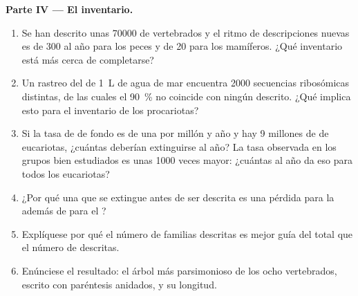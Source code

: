 \begin{problem}
\medskip
\noindent\textbf{Parte IV --- El inventario.}
\begin{enumerate}[resume]
  \item Se han descrito unas \num{70000}  de vertebrados y el ritmo
        de descripciones nuevas es de \num{300} al año para los peces y de
        \num{20} para los mamíferos. ¿Qué inventario está más cerca de
        completarse?
  \item Un rastreo del  de \qty{1}{L} de agua de mar encuentra
        \num{2000} secuencias ribosómicas distintas, de las cuales el
        \qty{90}{\%} no coincide con ningún  descrito. ¿Qué implica
        esto para el inventario de los procariotas?
  \item Si la tasa de  de fondo es de una  por millón y año
        y hay \num{9} millones de  de eucariotas, ¿cuántas deberían
        extinguirse al año? La tasa observada en los grupos bien estudiados
        es unas \num{1000} veces mayor: ¿cuántas al año da eso para todos
        los eucariotas?
  \item ¿Por qué una  que se extingue antes de ser descrita es una
        pérdida para la  además de para el ?
  \item Explíquese por qué el número de familias descritas es mejor guía del
        total que el número de  descritas.
  \item Enúnciese el resultado: el árbol más parsimonioso de los ocho
        vertebrados, escrito con paréntesis anidados, y su longitud.
\end{enumerate}
\end{problem}
